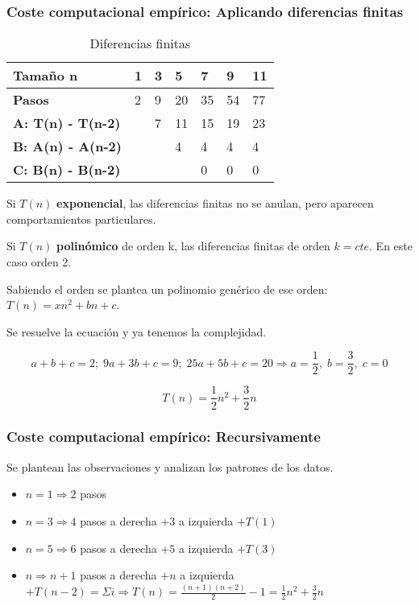 \subsubsection{Coste computacional empírico: Aplicando diferencias finitas}
\begin{table}[H]
	\begin{tabular}{|l|l|l|l|l|l|l|}
		\hline
		Tamaño n                  & \textbf{1} & \textbf{3} & \textbf{5} & \textbf{7} & \textbf{9} & \textbf{11} \\ \hline
		\textbf{Pasos}            & 2          & 9          & 20         & 35         & 54         & 77          \\ \hline
		\textbf{A: T(n) - T(n-2)} &            & 7          & 11         & 15         & 19         & 23          \\ \hline
		\textbf{B: A(n) - A(n-2)} &            &            & 4          & 4          & 4          & 4           \\ \hline
		\textbf{C: B(n) - B(n-2)} &            &            &            & 0          & 0          & 0           \\ \hline
	\end{tabular}
	\caption{Diferencias finitas}
\end{table}

Si $T(n)$ \textbf{exponencial}, las diferencias finitas no se anulan, pero aparecen comportamientos particulares.

Si $T(n)$ \textbf{polinómico} de orden k, las diferencias finitas de orden $k=cte$. En este caso orden 2.

Sabiendo el orden se plantea un polinomio genérico de ese orden: $T(n)=xn^2+bn+c$.

Se resuelve la ecuación y ya tenemos la complejidad.

$$a+b+c=2;\; 9a+3b+c=9;\; 25a+5b+c=20 \Rightarrow a=\frac{1}{2},\; b=\frac{3}{2},\; c=0$$

$$T(n)=\frac{1}{2}n^2+\frac{3}{2}n$$

\subsubsection{Coste computacional empírico: Recursivamente}
Se plantean las observaciones y analizan los patrones de los datos.

\begin{itemize}
	\item $n=1 \Rightarrow 2$ pasos
	\item $n=3 \Rightarrow 4$ pasos a derecha $+ 3$ a izquierda $+ T(1)$
	\item $n=5 \Rightarrow 6$ pasos a derecha $+ 5$ a izquierda $+ T(3)$
	\item $n \Rightarrow n+1$ pasos a derecha $+ n$ a izquierda $+ T(n-2) = \Sigma i \Rightarrow T(n)=\frac{(n+1)(n+2)}{2}-1=\frac{1}{2}n^2+\frac{3}{2}n$
\end{itemize}

